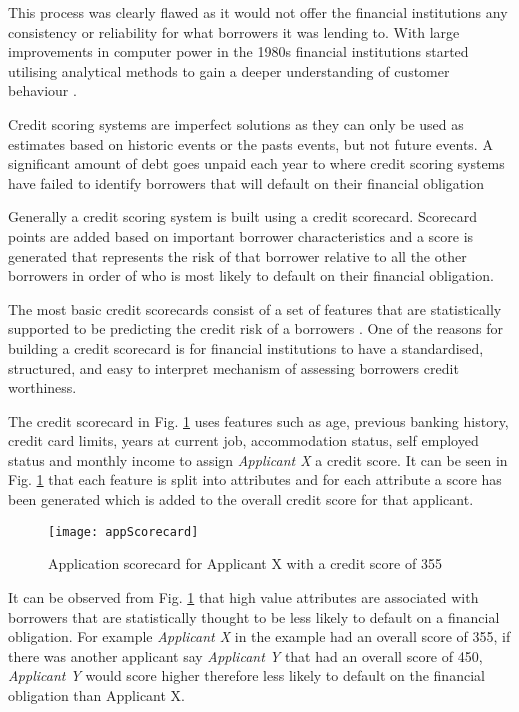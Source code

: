 This process was clearly flawed as it would not offer the financial institutions any consistency or reliability for what borrowers it was lending to. With large improvements in computer power in the 1980s financial institutions started utilising analytical methods to gain a deeper understanding of customer behaviour \citep{hand_modelling_2001}.

Credit scoring systems are imperfect solutions as they can only be used as estimates based on historic events or the pasts events, but not future events. A significant amount of debt goes unpaid each year to where credit scoring systems have failed to identify borrowers that will default on their financial obligation \citep{finlay_multiple_2011}

Generally a credit scoring system is built using a credit scorecard. Scorecard points are added based on important borrower characteristics and a score is generated that represents the risk of that borrower relative to all the other borrowers in order of who is most likely to default on their financial obligation.

The most basic credit scorecards consist of a set of features that are statistically supported to be predicting the credit risk of a borrowers \citep{siddiqi_credit_2012}. One of the reasons for building a credit scorecard is for financial institutions to have a standardised, structured, and easy to interpret mechanism of assessing borrowers credit worthiness.
 
The credit scorecard in Fig. \ref{fig:appScorecard} uses features such as age, previous banking history, credit card limits, years at current job, accommodation status, self employed status and monthly income to assign \textit{Applicant X} a credit score. It can be seen in Fig. \ref{fig:appScorecard} that each feature is split into attributes and for each attribute a score has been generated which is added to the overall credit score for that applicant. 

\begin{figure}[H]
	\texttt{[image: appScorecard]}
	\caption{Application scorecard for Applicant X with a credit score of 355	
	}
	\label{fig:appScorecard}
\end{figure}

It can be observed from Fig. \ref{fig:appScorecard} that high value attributes are associated with borrowers that are statistically thought to be less likely to default on a financial obligation. For example \textit{Applicant X} in the example had an overall score of 355, if there was another applicant say \textit{Applicant Y} that had an overall score of 450, \textit{Applicant Y} would score higher therefore less likely to default on the financial obligation than {Applicant X}.

